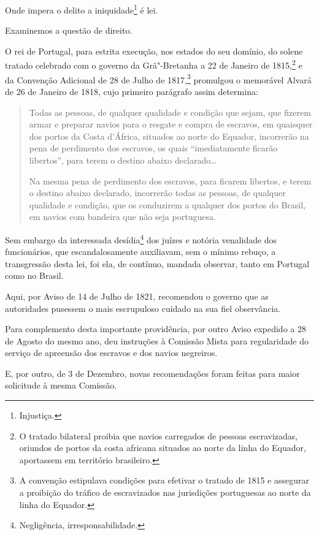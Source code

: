 Onde impera o delito a iniquidade\footnote{Injustiça.} é lei.

Examinemos a questão de direito.

O rei de Portugal, para estrita execução, nos estados do seu domínio, do
solene tratado celebrado com o governo da Grã"-Bretanha a 22 de Janeiro
de 1815,\footnote{O tratado bilateral proibia que navios carregados de
  pessoas escravizadas, oriundos de portos da costa africana situados ao
  norte da linha do Equador, aportassem em território brasileiro.} e da
Convenção Adicional de 28 de Julho de 1817,\footnote{A convenção
  estipulava condições para efetivar o tratado de 1815 e assegurar a
  proibição do tráfico de escravizados nas jurisdições portuguesas ao
  norte da linha do Equador.} promulgou o memorável Alvará de 26 de
Janeiro de 1818, cujo primeiro parágrafo assim determina:

\begin{quote}
Todas as pessoas, de qualquer qualidade e condição que sejam, que
fizerem armar e preparar navios para o resgate e compra de escravos, em
quaisquer dos portos da Costa d'África, situados ao norte do Equador,
incorrerão na pena de perdimento dos escravos, os quais ``imediatamente
ficarão libertos'', para terem o destino abaixo declarado\ldots{}

Na mesma pena de perdimento dos escravos, para ficarem libertos, e terem
o destino abaixo declarado, incorrerão todas as pessoas, de qualquer
qualidade e condição, que os conduzirem a qualquer dos portos do Brasil,
em navios com bandeira que não seja portuguesa.
\end{quote}

\asterisc

Sem embargo da interessada desídia\footnote{Negligência,
  irresponsabilidade.} dos juízes e notória venalidade dos funcionários,
que escandalosamente auxiliavam, sem o mínimo rebuço, a transgressão
desta lei, foi ela, de contínuo, mandada observar, tanto em Portugal
como no Brasil.

Aqui, por Aviso de 14 de Julho de 1821, recomendou o governo que as
autoridades pusessem o mais escrupuloso cuidado na sua fiel observância.

Para complemento desta importante providência, por outro Aviso expedido
a 28 de Agosto do mesmo ano, deu instruções à Comissão Mista para
regularidade do serviço de apreensão dos escravos e dos navios
negreiros.

E, por outro, de 3 de Dezembro, novas recomendações foram feitas para
maior solicitude à mesma Comissão.


